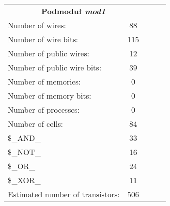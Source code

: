 \begin{table}[!htb]
	\begin{minipage}{0.55\linewidth}
		\centering
		\begin{tabular}{lllll}
			\cline{1-2}
			\multicolumn{2}{|c|}{\textbf{Podmoduł \emph{mod1}}} &  &  &  \\ \cline{1-2}
			\multicolumn{1}{|l|}{Number of wires:} & \multicolumn{1}{c|}{88} &  &  &  \\ \cline{1-2}
			\multicolumn{1}{|l|}{Number of wire bits:} & \multicolumn{1}{c|}{115} &  &  &  \\ \cline{1-2}
			\multicolumn{1}{|l|}{Number of public wires:} & \multicolumn{1}{c|}{12} &  &  &  \\ \cline{1-2}
			\multicolumn{1}{|l|}{Number of public wire bits:} & \multicolumn{1}{c|}{39} &  &  &  \\ \cline{1-2}
			\multicolumn{1}{|l|}{Number of memories:} & \multicolumn{1}{c|}{0} &  &  &  \\ \cline{1-2}
			\multicolumn{1}{|l|}{Number of memory bits: } & \multicolumn{1}{c|}{0} &  &  &  \\ \cline{1-2}
			\multicolumn{1}{|l|}{Number of processes: } & \multicolumn{1}{c|}{0} &  &  &  \\ \cline{1-2}
			\multicolumn{1}{|l|}{Number of cells:} & \multicolumn{1}{c|}{84} &  &  &  \\ \cline{1-2}
			\multicolumn{1}{|l|}{\$\_AND\_} & \multicolumn{1}{c|}{33} &  &  &  \\ \cline{1-2}
			\multicolumn{1}{|l|}{\$\_NOT\_} & \multicolumn{1}{c|}{16} &  &  &  \\ \cline{1-2}
			\multicolumn{1}{|l|}{\$\_OR\_} & \multicolumn{1}{c|}{24} &  &  &  \\ \cline{1-2}
			\multicolumn{1}{|l|}{\$\_XOR\_} & \multicolumn{1}{c|}{11} &  &  &  \\ \cline{1-2}
			\multicolumn{1}{|l|}{Estimated number of transistors:} & \multicolumn{1}{c|}{506} &  &  &  \\ \cline{1-2}
			

\end{tabular}
\end{minipage}
\end{table}
